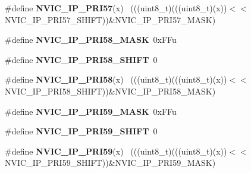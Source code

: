 \begin{DoxyCompactItemize}
\item 
\hypertarget{group___n_v_i_c___register___masks_ga90c7ddb1a8a417716c3570d0fc5a6146}{}\#define {\bfseries N\+V\+I\+C\+\_\+\+I\+P\+\_\+\+P\+R\+I57}(x)                                              ~(((uint8\+\_\+t)(((uint8\+\_\+t)(x))$<$$<$N\+V\+I\+C\+\_\+\+I\+P\+\_\+\+P\+R\+I57\+\_\+\+S\+H\+I\+F\+T))\&N\+V\+I\+C\+\_\+\+I\+P\+\_\+\+P\+R\+I57\+\_\+\+M\+A\+S\+K)\label{group___n_v_i_c___register___masks_ga90c7ddb1a8a417716c3570d0fc5a6146}

\item 
\hypertarget{group___n_v_i_c___register___masks_gaa88c75ace0f1db70a758e56086a673bc}{}\#define {\bfseries N\+V\+I\+C\+\_\+\+I\+P\+\_\+\+P\+R\+I58\+\_\+\+M\+A\+S\+K}~0x\+F\+Fu\label{group___n_v_i_c___register___masks_gaa88c75ace0f1db70a758e56086a673bc}

\item 
\hypertarget{group___n_v_i_c___register___masks_ga3dd20728bbdae39f9c008a0f615b3df8}{}\#define {\bfseries N\+V\+I\+C\+\_\+\+I\+P\+\_\+\+P\+R\+I58\+\_\+\+S\+H\+I\+F\+T}~0\label{group___n_v_i_c___register___masks_ga3dd20728bbdae39f9c008a0f615b3df8}

\item 
\hypertarget{group___n_v_i_c___register___masks_ga64aff0c989c290f9be0093fe0d568237}{}\#define {\bfseries N\+V\+I\+C\+\_\+\+I\+P\+\_\+\+P\+R\+I58}(x)                                              ~(((uint8\+\_\+t)(((uint8\+\_\+t)(x))$<$$<$N\+V\+I\+C\+\_\+\+I\+P\+\_\+\+P\+R\+I58\+\_\+\+S\+H\+I\+F\+T))\&N\+V\+I\+C\+\_\+\+I\+P\+\_\+\+P\+R\+I58\+\_\+\+M\+A\+S\+K)\label{group___n_v_i_c___register___masks_ga64aff0c989c290f9be0093fe0d568237}

\item 
\hypertarget{group___n_v_i_c___register___masks_ga5eb7ed9e63a765d595ecc3c4b5679663}{}\#define {\bfseries N\+V\+I\+C\+\_\+\+I\+P\+\_\+\+P\+R\+I59\+\_\+\+M\+A\+S\+K}~0x\+F\+Fu\label{group___n_v_i_c___register___masks_ga5eb7ed9e63a765d595ecc3c4b5679663}

\item 
\hypertarget{group___n_v_i_c___register___masks_gae8e768054512b851ebf013ee707bc9b9}{}\#define {\bfseries N\+V\+I\+C\+\_\+\+I\+P\+\_\+\+P\+R\+I59\+\_\+\+S\+H\+I\+F\+T}~0\label{group___n_v_i_c___register___masks_gae8e768054512b851ebf013ee707bc9b9}

\item 
\hypertarget{group___n_v_i_c___register___masks_ga83d5f4de31732651441a18926e39c0bd}{}\#define {\bfseries N\+V\+I\+C\+\_\+\+I\+P\+\_\+\+P\+R\+I59}(x)                                              ~(((uint8\+\_\+t)(((uint8\+\_\+t)(x))$<$$<$N\+V\+I\+C\+\_\+\+I\+P\+\_\+\+P\+R\+I59\+\_\+\+S\+H\+I\+F\+T))\&N\+V\+I\+C\+\_\+\+I\+P\+\_\+\+P\+R\+I59\+\_\+\+M\+A\+S\+K)\label{group___n_v_i_c___register___masks_ga83d5f4de31732651441a18926e39c0bd}


\end{DoxyCompactItemize}
